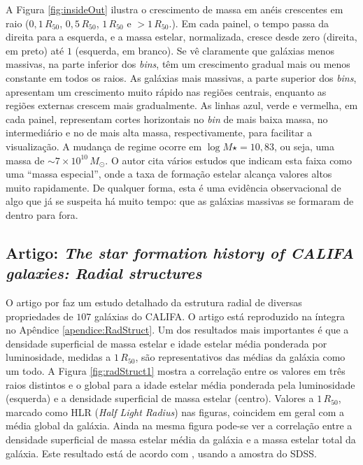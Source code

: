 A Figura \ref{fig:insideOut} ilustra o crescimento de massa em anéis crescentes
em raio ($0,1\,R_{50}$, $0,5\,R_{50}$, $1\,R_{50}$ e $>1\,R_{50}$.). Em cada
painel, o tempo passa da direita para a esquerda, e a massa estelar,
normalizada, cresce desde zero (direita, em preto) até $1$ (esquerda, em
branco). Se vê claramente que galáxias menos massivas, na parte inferior dos
{\em bins}, têm um crescimento gradual mais ou menos constante em todos os
raios. As galáxias mais massivas, a parte superior dos {\em bins}, apresentam um
crescimento muito rápido nas regiões centrais, enquanto as regiões externas
crescem mais gradualmente. As linhas azul, verde e vermelha, em cada painel,
representam cortes horizontais no {\em bin} de mais baixa massa, no
intermediário e no de mais alta massa, respectivamente, para facilitar a
visualização. A mudança de regime ocorre em $\log M\star = 10,83$, ou seja, uma
massa de $\sim 7\times10^{10}\,M_\odot$. O autor cita vários estudos que indicam
esta faixa como uma ``massa especial'', onde a taxa de formação estelar alcança
valores altos muito rapidamente. De qualquer forma, esta é uma evidência
observacional de algo que já se suspeita há muito tempo:
que as galáxias massivas se formaram de dentro para fora.



\subsection{Artigo: {\em The star formation history of CALIFA galaxies: Radial
structures}}
\label{sec:pycasso:art:RadStruct}

O artigo por \citet{GonzalezDelgado2014a} faz um estudo detalhado da estrutura
radial de diversas propriedades de $107$ galáxias do CALIFA. O artigo está
reproduzido na íntegra no Apêndice \ref{apendice:RadStruct}.
Um dos resultados mais importantes é que a densidade superficial de massa
estelar e idade estelar média ponderada por luminosidade, medidas a $1\,R_{50}$,
são representativos das médias da galáxia como um todo. A Figura
\ref{fig:radStruct1} mostra a correlação entre os valores em três raios
distintos e o global para a idade estelar média ponderada pela luminosidade
(esquerda) e a densidade superficial de massa estelar (centro). Valores a
$1\,R_{50}$, marcado como HLR ({\em Half Light Radius}) nas figuras, coincidem
em geral com a média global da galáxia.
Ainda na mesma figura pode-se ver a correlação entre a densidade superficial de
massa estelar média da galáxia e a massa estelar total da galáxia. Este
resultado está de acordo com \citet{Kauffmann2003}, usando a amostra do SDSS.

